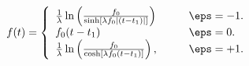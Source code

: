 \begin{equation}
f(t) = \left\{ \begin{array}{ll}
 \frac1{\lambda}\ln\left(\frac{f_0}{\sinh[\lambda f_0 |(t-t_1)|
   ]} \right) \qquad & \eps = -1. \\
 f_0 (t-t_1) & \eps = 0. \\
 \frac1{\lambda}\ln\left(\frac{f_0}{\cosh[\lambda f_0 (t-t_1)
   ]} \right), & \eps = +1. \end{array} \right.
\end{equation}

